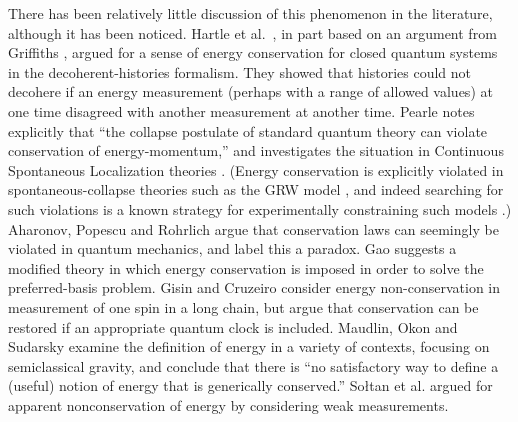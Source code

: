\documentclass[aps,prd,onecolumn,nofootinbib,notitlepage]{revtex4-1}
\begin{document}
There has been relatively little discussion of this phenomenon in the literature, although it has been noticed.
Hartle et al.~\cite{hartle1995conservation}, in part based on an argument from Griffiths \cite{griffiths}, argued for a sense of energy conservation for closed quantum systems in the decoherent-histories formalism.
They showed that histories could not decohere if an energy measurement (perhaps with a range of allowed values) at one time disagreed with another measurement at another time.
Pearle \cite{Pearle:2000qb} notes explicitly that ``the collapse postulate of standard quantum theory can violate conservation of energy-momentum,'' and investigates the situation in Continuous Spontaneous Localization theories \cite{Pearle:1988uh,Ghirardi:1989cn}.
(Energy conservation is explicitly violated in spontaneous-collapse theories such as the GRW model \cite{Ghirardi:1985mt}, and indeed searching for such violations is a known strategy for experimentally constraining such models \cite{vinante2016upper}.)
Aharonov, Popescu and Rohrlich  \cite{2016arXiv160905041A} argue that conservation laws can seemingly be violated in quantum mechanics, and label this a paradox.
Gao \cite{Gao:2016cmq} suggests a modified theory in which energy conservation is imposed in order to solve the preferred-basis problem.
Gisin and Cruzeiro \cite{gisin2018quantum} consider energy non-conservation in measurement of one spin in a long chain, but argue that conservation can be restored if an appropriate quantum clock is included.
Maudlin, Okon and Sudarsky \cite{Maudlin:2019bje} examine the definition of energy in a variety of contexts, focusing on semiclassical gravity, and conclude that there is ``no satisfactory way to define a (useful) notion of energy that is generically conserved.''
So{\l}tan et al. \cite{2019arXiv190706354S} argued for apparent nonconservation of energy by considering weak measurements.
\end{document}
